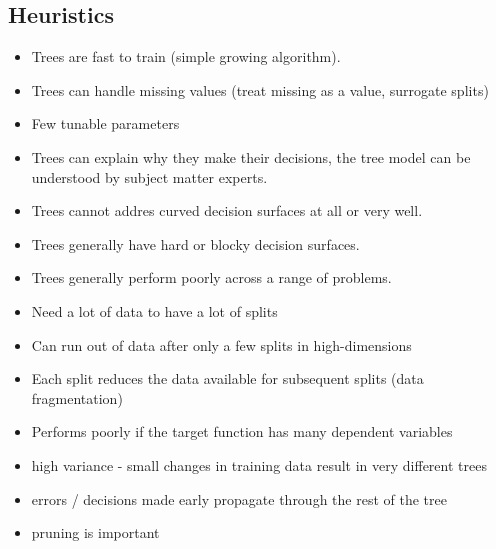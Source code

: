 \begin{bibunit}
\subsection{Heuristics}

\begin{itemize}
	\item Trees are fast to train (simple growing algorithm).
	\item Trees can handle missing values (treat missing as a value, surrogate splits)
	\item Few tunable parameters
	\item Trees can explain why they make their decisions, the tree model can be understood by subject matter experts.
	\item Trees cannot addres curved decision surfaces at all or very well.
	\item Trees generally have hard or blocky decision surfaces.
	\item Trees generally perform poorly across a range of problems.


	\item Need a lot of data to have a lot of splits
	\item Can run out of data after only a few splits in high-dimensions
	\item Each split reduces the data available for subsequent splits (data fragmentation)
	\item Performs poorly if the target function has many dependent variables 
	\item high variance - small changes in training data result in very different trees
	\item errors / decisions made early propagate through the rest of the tree
	\item pruning is important

\end{itemize}




\end{bibunit}
